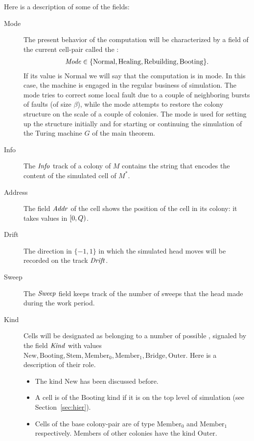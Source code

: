 \documentclass[11pt]{memoir}
\theoremstyle{definition} %
\newcommand{\fld}[1]{\ensuremath{\textit{#1\/}}}
\def\G{G} %
\newcommand{\Q}{Q} %
\newcommand{\Addr}{\fld{Addr}}
\newcommand{\Drift}{\fld{Drift}}
\newcommand{\Info}{\fld{Info}}
\newcommand{\Kind}{\fld{Kind}}
\newcommand{\Mode}{\fld{Mode}}
\newcommand{\Sweep}{\fld{Sweep}} %
\newcommand{\Normal}{\mathrm{Normal}}
\newcommand{\Healing}{\mathrm{Healing}}
\newcommand{\Rebuilding}{\mathrm{Rebuilding}}
\newcommand{\New}{\mathrm{New}}
\newcommand{\Stem}{\mathrm{Stem}}
\newcommand{\Booting}{\mathrm{Booting}}
\newcommand{\Bridge}{\mathrm{Bridge}}
\newcommand{\Member}{\mathrm{Member}}
\newcommand{\Outer}{\mathrm{Outer}}
\begin{document}
Here is a description of some of the fields:
\begin{description}
\item[Mode] The present behavior of the computation will be characterized by
a field of the current cell-pair called the :
 \begin{align*}
   \Mode\in\{ \Normal,\Healing, \Rebuilding,\Booting \}.
 \end{align*}
 If its value is \( \Normal \) we will say that the computation is in  mode.
 In this case, the machine is engaged in the regular business of simulation.
The  mode tries to correct some local fault due to a couple of neighboring
bursts of faults (of size \( \beta \)),
while the  mode attempts to restore the colony structure
on the scale of a couple of colonies.
The  mode is used for setting up the structure initially and for starting or continuing the
simulation of the Turing machine \( \G \) of the main theorem.

\item[Info] The  \( \Info \) track of a colony of \( M \)
  contains the string that encodes the content of the simulated cell of \( M^{*} \).

\item[Address] The field \( \Addr \)
of the cell shows the position of the cell in its colony:
it takes values in \( \lint{0}{\Q} \).

\item[Drift] The direction in \( \{-1,1\} \) in which the simulated head moves will be recorded on the track
 \( \Drift \).

\item[Sweep] The \( \Sweep \)
  field keeps track of the number of sweeps that the head made during the work period.

\item[Kind] Cells will be designated as belonging to a number of
  possible , signaled by the field \( \Kind \)
with values \(  \New, \Booting, \Stem, \Member_{0},\Member_{1},\Bridge, \Outer \).
Here is a description of their role.
\begin{itemize}
\item The kind \( \New \) has been discussed before.
\item A cell is of the \( \Booting \) kind if it is on the top level of simulation (see Section~\ref{sec:hier}).

\item Cells of the base colony-pair are of type \( \Member_{0} \) and \( \Member_{1} \) respectively.
  Members of other colonies have the kind \( \Outer \).


\end{itemize}
\end{description}
\end{document}
